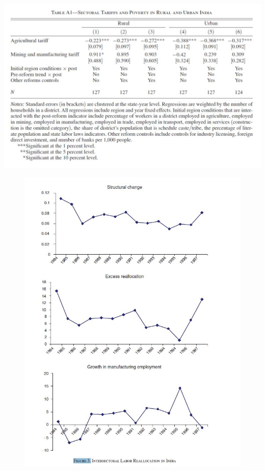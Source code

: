 \documentclass[a4paper,12pt]{article}
\begin{document}
\begin{table}[h]
\centering
\includegraphics[width=1\textwidth]{table1Appendix.JPG}
\caption{\label{fig:Figure1}}
\end{table}

\begin{figure}[h]
\centering
\includegraphics[width=1\textwidth]{fig3.JPG}
\caption{\label{fig:Figure1}}
\end{figure}
\end{document}
